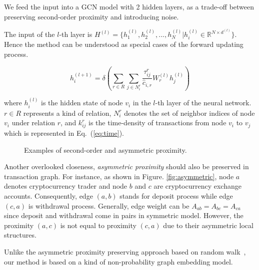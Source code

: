  We feed the input into a GCN model with 2 hidden layers, as a trade-off between preserving second-order proximity and introducing noise. 
 
 The input of the $l$-th layer is $H^{(l)}=\{h_1^{(l)},h_2^{(l)},...,h_N^{(l)}|h_i^{(l)}\in \mathbb{R}^{N \times d^{(l)}}\}$. Hence the method can be understood as special cases of the forward updating process.

\begin{equation}
h_i^{(l+1)}=\delta(\sum_{r\in R} \sum_{j \in N_i^r} \frac{\tau_{ij}^r}{\hat c_{i,r}}W_r^{(l)}h_j^{(l)})
\end{equation}

\noindent where $h_i^{(l)}$ is the hidden state of node $v_i$ in the $l$-th layer of the neural network. $r \in R$ represents a kind of relation, $N_i^r$ denotes the set of neighbor indices of node $v_i$ under relation $r$, and $k_{ij}^r$ is the time-density of transactions from node $v_i$ to $v_j$ which is represented in Eq.~(\ref{eq:time}).



\begin{figure}[htbp]
	\centering
	\caption{Examples of second-order and asymmetric proximity.}

\end{figure}


Another overlooked closeness, \emph{asymmetric proximity} should also be preserved in transaction graph. For instance, as shown in Figure. \ref{fig:asymmetric}, node $a$ denotes cryptocurrency trader and node $b$ and $c$ are cryptocurrency exchange accounts. Consequently, edge $(a,b)$ stands for deposit process while edge $(c,a)$ is withdrawal process. Generally, edge weight can be $A_{ab}=A_{bc}=A_{ca}$ since deposit and withdrawal come in pairs in symmetric model. However, the proximity $(a,c)$ is not equal to proximity $(c,a)$ due to their asymmetric local structures.

Unlike the asymmetric proximity preserving approach based on random walk~\cite{zhou2017scalable}, our method is based on a kind of non-probability graph embedding model.
 
